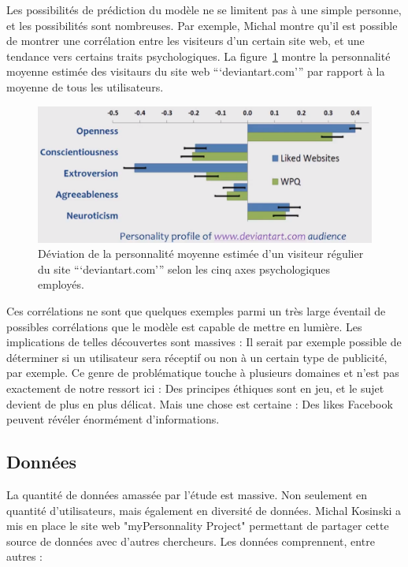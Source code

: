 		Les possibilités de prédiction du modèle ne se limitent pas à une simple personne, et les possibilités sont nombreuses. Par exemple, Michal montre qu'il est possible de montrer une corrélation entre les visiteurs d'un certain site web, et une tendance vers certains traits psychologiques. La figure~\ref{a-talk2} montre la personnalité moyenne estimée des visitaurs du site web ```deviantart.com''' par rapport à la moyenne de tous les utilisateurs.

		\begin{figure}[ht]
			\centering
			\includegraphics[width=1\textwidth]{images/analysis/talk2}
			\caption{Déviation de la personnalité moyenne estimée d'un visiteur régulier du site ```deviantart.com''' selon les cinq axes psychologiques employés\cite{kosinski-talk}.}
			\label{a-talk2}
		\end{figure}

		Ces corrélations ne sont que quelques exemples parmi un très large éventail de possibles corrélations que le modèle est capable de mettre en lumière. Les implications de telles découvertes sont massives : Il serait par exemple possible de déterminer si un utilisateur sera réceptif ou non à un certain type de publicité, par exemple. Ce genre de problématique touche à plusieurs domaines et n'est pas exactement de notre ressort ici : Des principes éthiques sont en jeu, et le sujet devient de plus en plus délicat. Mais une chose est certaine : Des likes Facebook peuvent révéler énormément d'informations.

	\subsection{Données}

		La quantité de données amassée par l'étude est massive. Non seulement en quantité d'utilisateurs, mais également en diversité de données. Michal Kosinski a mis en place le site web "myPersonnality Project"\cite{mypersonnality} permettant de partager cette source de données avec d'autres chercheurs. Les données comprennent, entre autres :

